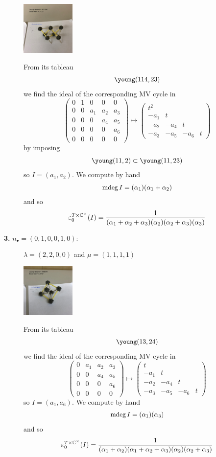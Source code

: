 \documentclass[11pt]{article}
\begin{document}
\begin{description}
    \includegraphics[height=100px]{img/2123.jpeg}

    From its tableau 
    $$
    \young(114,23)
    $$
    we find the ideal of the corresponding MV cycle in 
    $$\begin{pmatrix}
        0&1&0&0&0\\
        0&0&{a}_{1}&{a}_{2}&{a}_{3}\\
        0&0&0&{a}_{4}&{a}_{5}\\
        0&0&0&0&{a}_{6}\\
        0&0&0&0&0\end{pmatrix}\mapsto \begin{pmatrix}
            t^2 \\
            -a_1 & t \\
            -a_2 & -a_4 & t \\
            -a_3 & -a_5 & -a_6 & t 
        \end{pmatrix}$$
    by imposing 
    $$
    \young(11,2)\subset\young(11,23)
    $$
    so $I = (a_1,a_2)$. We compute by hand 
    $$
    \operatorname{mdeg} I = (\alpha_1) (\alpha_1 + \alpha_2)
    $$
    and so 
    $$
    \varepsilon^{T\times\mathbb C^\times}_0(I) = \frac{1}{(\alpha_1 + \alpha_2 + \alpha_3)(\alpha_2)(\alpha_2 + \alpha_3)(\alpha_3)}
    $$
    \item[{\bf 3.} $n_\bullet = (0,1,0,0,1,0)$:] $\lambda = (2,2,0,0)$ and $\mu = (1,1,1,1)$ \hfill 

    \includegraphics[height=100px]{img/2312.jpeg}

    From its tableau 
    $$
    \young(13,24)
    $$
    we find the ideal of the corresponding MV cycle in 
    $$\begin{pmatrix}
        0&{a}_{1}&{a}_{2}&{a}_{3}\\
        0&0&{a}_{4}&{a}_{5}\\
        0&0&0&{a}_{6}\\
        0&0&0&0\end{pmatrix}\mapsto \begin{pmatrix}
            t \\
            -a_1 & t \\
            -a_2 & -a_4 & t \\
            -a_3 & -a_5 & -a_6 & t
        \end{pmatrix}$$
    so $I = (a_1,a_6)$. We compute by hand 
    $$
    \operatorname{mdeg} I = (\alpha_1) (\alpha_3)
    $$
    and so 
    $$
    \varepsilon^{T\times\mathbb C^\times}_0(I) = \frac{1}{(\alpha_1 + \alpha_2)(\alpha_1 + \alpha_2 + \alpha_3)(\alpha_2)(\alpha_2 + \alpha_3)}
    $$


\end{description}
\end{document}
